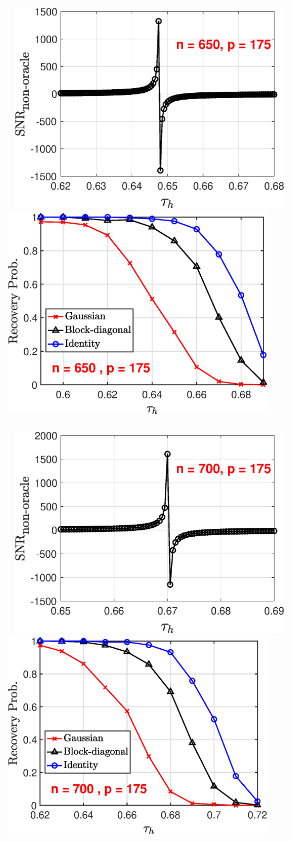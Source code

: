 \documentclass[11pt]{article}
\begin{document}
\begin{figure}[h]
\centering

\mbox{
\includegraphics[width = 2.8in]{figs/snr_nonracle_n650_p175.eps}\hspace{0.2in}
\includegraphics[width = 2.7in]{figs/DiffB_mat_n650_p175.eps}
}


\mbox{
\includegraphics[width = 2.8in]{figs/snr_nonracle_n700_p175.eps}\hspace{0.2in}
\includegraphics[width = 2.7in]{figs/DiffB_mat_n700_p175.eps}
}


\end{figure}
\end{document}
